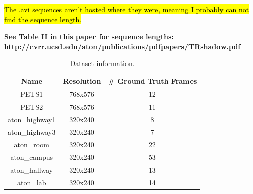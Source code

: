\documentclass[12pt]{report}
\newcommand{\comment}[1]
           {\par {\bfseries \color{blue} #1 \par}}
\begin{document}
\hl{The .avi sequences aren't hosted where they were, meaning I probably can not find the sequence length.}
\comment{See Table II in this paper for sequence lengths:\\
  http://cvrr.ucsd.edu/aton/publications/pdfpapers/TRshadow.pdf}

\begin{table}
\centering
\begin{tabular}{ |c|c|c| }
	\hline
	\textbf{Name} & \textbf{Resolution} & \textbf{\# Ground Truth Frames} \\
	\hline
	\hline
	PETS1 & 768x576 & 12 \\
	\hline
	PETS2 & 768x576 & 11 \\
	\hline
	aton\_highway1 & 320x240 & 8 \\
	\hline 
	aton\_highway3 & 320x240 & 7 \\ 
	\hline
	aton\_room & 320x240 & 22 \\ 
	\hline
	aton\_campus & 320x240 & 53 \\ 
	\hline
	aton\_hallway & 320x240 & 13 \\
	\hline
	aton\_lab & 320x240 & 14 \\ 
	\hline
\end{tabular} \label{table:datasets}
\caption{Dataset information.}
\end{table}
\end{document}
